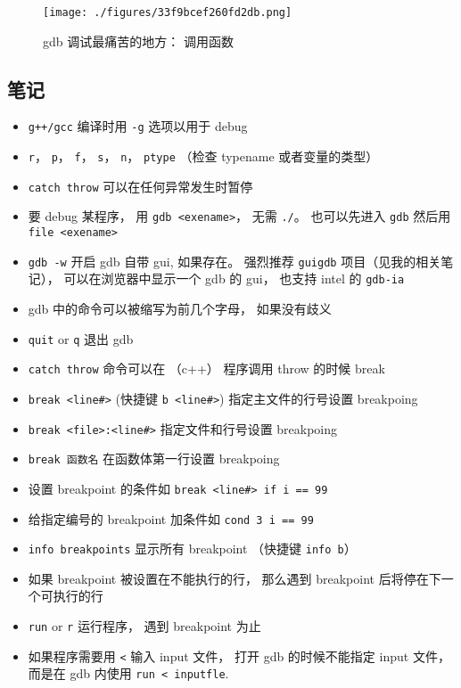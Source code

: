 

\begin{figure}[ht]
\centering
\texttt{[image: ./figures/33f9bcef260fd2db.png]}
\caption{gdb 调试最痛苦的地方： 调用函数} \label{fig_gdbNt_1}
\end{figure}

\subsection{笔记}
\begin{itemize}
\item \verb|g++/gcc| 编译时用 \verb`-g` 选项以用于 debug
\item \verb|r|， \verb|p|， \verb|f|， \verb|s|， \verb|n|， \verb|ptype| （检查 typename 或者变量的类型）
\item \verb|catch throw| 可以在任何异常发生时暂停
\item 要 debug 某程序， 用 \verb`gdb <exename>`， 无需 \verb`./`。 也可以先进入 \verb`gdb` 然后用 \verb`file <exename>`
\item \verb`gdb -w` 开启 gdb 自带 gui, 如果存在。 强烈推荐 \verb`guigdb` 项目（见我的相关笔记）， 可以在浏览器中显示一个 gdb 的 gui， 也支持 intel 的 \verb`gdb-ia`
\item gdb 中的命令可以被缩写为前几个字母， 如果没有歧义
\item \verb`quit` or \verb`q` 退出 gdb
\item \verb`catch throw` 命令可以在 （c++） 程序调用 throw 的时候 break
\item \verb`break <line#>`  (快捷键 \verb`b <line#>`) 指定主文件的行号设置 breakpoing
\item \verb`break <file>:<line#>` 指定文件和行号设置 breakpoing
\item \verb`break 函数名` 在函数体第一行设置 breakpoing
\item 设置 breakpoint 的条件如 \verb`break <line#> if i == 99`
\item 给指定编号的 breakpoint 加条件如 \verb`cond 3 i == 99`
\item \verb`info breakpoints` 显示所有 breakpoint （快捷键 \verb`info b`）
\item 如果 breakpoint 被设置在不能执行的行， 那么遇到 breakpoint 后将停在下一个可执行的行
\item \verb`run` or \verb`r` 运行程序， 遇到 breakpoint 为止
\item 如果程序需要用 \verb`<` 输入 input 文件， 打开 gdb 的时候不能指定 input 文件， 而是在 gdb 内使用 \verb`run < inputfle`.

\end{itemize}
